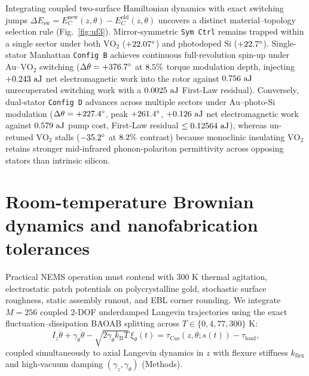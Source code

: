 \documentclass[11pt,a4paper]{article}
\begin{document}
Integrating coupled two-surface Hamiltonian dynamics with exact switching jumps $\Delta E_{\mathrm{sw}} = E_C^{\mathrm{new}}(z,\theta) - E_C^{\mathrm{old}}(z,\theta)$ uncovers a distinct material--topology selection rule (Fig.~\ref{fig:uf3}). Mirror-symmetric \texttt{Sym Ctrl} remains trapped within a single sector under both $\mathrm{VO}_2$ ($+22.07{}^\circ$) and photodoped $\mathrm{Si}$ ($+22.7{}^\circ$). Single-stator Manhattan \texttt{Config B} achieves continuous full-revolution spin-up under $\mathrm{Au}\text{--}\mathrm{VO}_2$ switching ($\Delta\theta = +376.7{}^\circ$ at $8.5{}\%$ torque modulation depth, injecting $+0.243{}\text{ aJ}$ net electromagnetic work into the rotor against $0.756{}\text{ aJ}$ unrecuperated switching work with a $0.0025{}\text{ aJ}$ First-Law residual). Conversely, dual-stator \texttt{Config D} advances across multiple sectors under $\mathrm{Au}\text{--}\text{photo-Si}$ modulation ($\Delta\theta = +227.4{}^\circ$, peak $+261.4{}^\circ$, $+0.126{}\text{ aJ}$ net electromagnetic work against $0.579{}\text{ aJ}$ pump cost, First-Law residual $\le 0.12564{}\text{ aJ}$), whereas un-retuned $\mathrm{VO}_2$ stalls ($-35.2{}^\circ$ at $8.2{}\%$ contrast) because monoclinic insulating $\mathrm{VO}_2$ retains stronger mid-infrared phonon-polariton permittivity across opposing stators than intrinsic silicon.

\section*{Room-temperature Brownian dynamics and nanofabrication tolerances}

Practical NEMS operation must contend with $300\text{ K}$ thermal agitation, electrostatic patch potentials on polycrystalline gold\cite{garrett2015patch}, stochastic surface roughness, static assembly runout, and EBL corner rounding. We integrate $M=256$ coupled 2-DOF underdamped Langevin trajectories using the exact fluctuation--dissipation BAOAB splitting\cite{leimkuhler2013baoab} across $T \in \{0, 4, 77, 300\}\text{ K}$:
\begin{equation}
I_z \ddot{\theta} + \gamma_\theta \dot{\theta} - \sqrt{2\gamma_\theta k_{\mathrm{B}} T}\,\xi_\theta(t) = \tau_{\mathrm{Cas}}(z,\theta;s(t)) - \tau_{\mathrm{load}},
\label{eq:langevin_theta}
\end{equation}
coupled simultaneously to axial Langevin dynamics in $z$ with flexure stiffness $k_{\mathrm{flex}}$ and high-vacuum damping $(\gamma_z,\gamma_\theta)$ (Methods).
\end{document}
